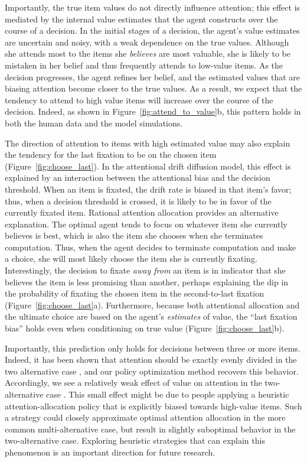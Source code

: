 \documentclass[12pt,a4paperpaper,]{article}
\begin{document}
Importantly, the true item values do not directly influence attention; this effect is mediated by the internal value estimates that the agent constructs over the course of a decision. In the initial stages of a decision, the agent's value estimates are uncertain and noisy, with a weak dependence on the true values. Although she attends most to the items she \emph{believes} are most valuable, she is likely to be mistaken in her belief and thus frequently attends to low-value items. As the decision progresses, the agent refines her belief, and the estimated values that are biasing attention become closer to the true values. As a result, we expect that the tendency to attend to high value items will increase over the course of the decision. Indeed, as shown in Figure~\ref{fig:attend_to_value}b, this pattern holds in both the human data and the model simulations.

The direction of attention to items with high estimated value may also explain the tendency for the last fixation to be on the chosen item (Figure~\ref{fig:choose_last}). In the attentional drift diffusion model, this effect is explained by an interaction between the attentional bias and the decision threshold. When an item is fixated, the drift rate is biased in that item's favor; thus, when a decision threshold is crossed, it is likely to be in favor of the currently fixated item. Rational attention allocation provides an alternative explanation. The optimal agent tends to focus on whatever item she currently believes is best, which is also the item she chooses when she terminates computation. Thus, when the agent decides to terminate computation and make a choice, she will most likely choose the item she is currently fixating. Interestingly, the decision to fixate \textit{away from} an item is in indicator that she believes the item is less promising than another, perhaps explaining the dip in the probability of fixating the chosen item in the second-to-last fixation (Figure~\ref{fig:choose_last}a). Furthermore, because both attentional allocation and the ultimate choice are based on the agent's \textit{estimates} of value, the ``last fixation bias'' holds even when conditioning on true value (Figure~\ref{fig:choose_last}b).

Importantly, this prediction only holds for decisions between three or more items. Indeed, it has been shown that attention should be exactly evenly divided in the two alternative case \citep{Fudenberg2018}, and our policy optimization method recovers this behavior. Accordingly, we see a relatively weak effect of value on attention in the two-alternative case \citep{Krajbich2010}. This small effect might be due to people applying a heuristic attention-allocation policy that is explicitly biased towards high-value items. Such a strategy could closely approximate optimal attention allocation in the more common multi-alternative case, but result in slightly suboptimal behavior in the two-alternative case. Exploring heuristic strategies that can explain this phenomenon is an important direction for future research.
\end{document}
